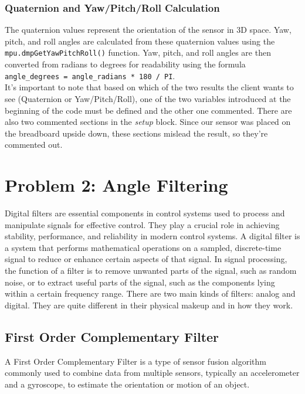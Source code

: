 \documentclass[conference]{IEEEtran}
\let\oldtexttt\texttt
\renewcommand{\texttt}[1]{\small\oldtexttt{#1}}
\begin{document}
\subsubsection{Quaternion and Yaw/Pitch/Roll Calculation}

The quaternion values represent the orientation of the sensor in 3D space. Yaw, pitch, and roll angles are calculated from these quaternion values using the \texttt{mpu.dmpGetYawPitchRoll()} function. Yaw, pitch, and roll angles are then converted from radians to degrees for readability using the formula \texttt{angle\_degrees = angle\_radians * 180 / PI}.\\

It's important to note that based on which of the two results the client wants to see (Quaternion or Yaw/Pitch/Roll), one of the two variables introduced at the beginning of the code must be defined and the other one commented. There are also two commented sections in the \textit{setup} block. Since our sensor was placed on the breadboard upside down, these sections mislead the result, so they're commented out.
\vspace{10px}






\section{Problem 2: Angle Filtering}
Digital filters are essential components in control systems used to process and manipulate signals for effective control. They play a crucial role in achieving stability, performance, and reliability in modern control systems.
A digital filter is a system that performs mathematical operations on a sampled, discrete-time signal to reduce or enhance certain aspects of that signal. In signal processing, the function of a filter is to remove unwanted parts of the signal, such as random noise, or to extract useful parts of the signal, such as the components lying within a certain frequency range. There are two main kinds of filters: analog and digital. They are quite different in their physical makeup and in how they work.

\subsection{First Order Complementary Filter}
A First Order Complementary Filter is a type of sensor fusion algorithm commonly used to combine data from multiple sensors, typically an accelerometer and a gyroscope, to estimate the orientation or motion of an object.\\
\end{document}
